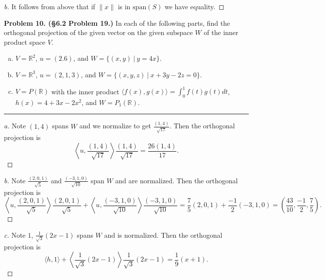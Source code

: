 \documentclass[leqno]{article}
\theoremstyle{nonumberplain}
\newtheorem{proof}{Proof}
\newcommand{\R}{\mathbb{R}}
\begin{document}
\begin{proof}[b]
It follows from above that if $\|x\|$ is in $\mathrm{span}(S)$ we have equality.
\end{proof}


\pagebreak





\noindent\textbf{Problem 10. (\S 6.2 Problem 19.)} In each of the following parts, find the orthogonal projection of the given vector on the given subspace $W$ of the inner product space $V$.
\begin{enumerate}[(a)]
\item $V=\R^2$, $u=(2.6)$, and $W=\{(x,y) ~\vert~ y=4x\}$.
\item $V=\R^3$, $u=(2,1,3)$, and $W=\{(x,y,z) ~\vert~ x+3y-2z=0 \}$.
\item $V=P(\R)$ with the inner product $\langle f(x),g(x) \rangle = \int_0^1 f(t)g(t)dt$, $h(x)=4+3x-2x^2$, and $W=P_1(\R)$.
\end{enumerate}

\noindent\rule[0.5ex]{\linewidth}{1pt}

\begin{proof}[a]
Note $(1,4)$ spans $W$ and we normalize to get $\frac{(1,4)}{\sqrt{17}}$.  Then the orthogonal projection is
\[
\left\langle u, \frac{(1,4)}{\sqrt{17}} \right\rangle \frac{(1,4)}{\sqrt{17}} = \frac{26 (1,4)}{17}.
\]
\end{proof}

\begin{proof}[b]
Note $\frac{(2,0,1)}{\sqrt{5}}$ and $\frac{(-3,1,0)}{\sqrt{10}}$ span $W$ and are normalized.  Then the orthogonal projection is
\[
\left\langle u, \frac{(2,0,1)}{\sqrt{5}}\right\rangle \frac{(2,0,1)}{\sqrt{5}} + \left\langle  u,\frac{(-3,1,0)}{\sqrt{10}} \right\rangle \frac{(-3,1,0)}{\sqrt{10}} = \frac{7}{5}(2,0,1)+\frac{-1}{2}(-3,1,0)=\left(\frac{43}{10}, \frac{-1}{2}, \frac{7}{5} \right).
\]
\end{proof}

\begin{proof}[c]
Note $1$, $\frac{1}{\sqrt{3}} (2x-1)$ spans $W$ and is normalized.  Then the orthogonal projection is
\[
\langle h,1\rangle + \left\langle \frac{1}{\sqrt{3}} (2x-1)\right\rangle \frac{1}{\sqrt{3}} (2x-1)= \frac{1}{9}(x+1).
\]
\end{proof}

\pagebreak
\end{document}
